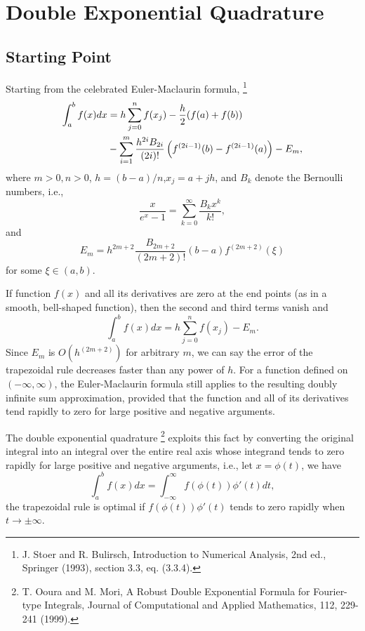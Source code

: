 \chapter{Double Exponential Quadrature}

\section{Starting Point}

Starting from the celebrated Euler-Maclaurin formula, 
\footnote{J. Stoer and R. Bulirsch, Introduction to Numerical Analysis, 2nd ed.,
Springer (1993), section 3.3, eq. (3.3.4).}
\begin{align}
  \int_a^b f(x) dx 
    &= h\sum_{j=0}^n f(x_j) - \frac{h}{2}(f(a)+f(b)) \notag \\
    &- \sum_{i=1}^m \frac{h^{2i} B_{2i}}{ (2i)! } 
       \left( f^{(2i-1)}(b) - f^{(2i-1)}(a)  \right)
       - E_m, \notag \\
\end{align}
where $m>0,n>0$, $h=(b-a)/n$,$x_j=a+jh$,
and $B_k$ denote the Bernoulli numbers, i.e., 
\begin{equation}
  \frac{x}{e^x-1} = \sum_{k=0}^{\infty} \frac{B_k x^k}{k!},
\end{equation}
and 
\begin{equation}
  E_m = h^{2m+2} \frac{B_{2m+2}}{(2m+2)!} (b-a) f^{(2m+2)}(\xi)
\end{equation}
for some $\xi \in (a,b)$.

If function $f(x)$ and all its derivatives are zero at the end points (as in a
smooth, bell-shaped function), then the second and third terms vanish and 
\begin{equation}
  \int_a^b f(x) dx = h\sum_{j=0}^n f(x_j) - E_m.
\end{equation}
Since $E_m$ is $O(h^{(2m+2)})$ for arbitrary $m$, we can say the error of the
trapezoidal rule decreases faster than any power of $h$. For a function defined
on $(-\infty,\infty)$, the Euler-Maclaurin formula still applies to the
resulting doubly infinite sum approximation, provided that the function and all
of its derivatives tend rapidly to zero for large positive and negative
arguments.

The double exponential quadrature 
\footnote{T. Ooura and M. Mori, A Robust Double Exponential Formula for
Fourier-type Integrals, Journal of Computational and Applied Mathematics, 112,
229-241 (1999).}
exploits this fact by converting the original
integral into an integral over the entire real axis whose integrand tends to
zero rapidly for large positive and negative arguments, i.e., let $x=\phi(t)$,
we have
\[
  \int_a^b f(x) dx = \int_{-\infty}^{\infty} f(\phi(t)) \phi'(t) dt,
\]
the trapezoidal rule is optimal if $f(\phi(t)) \phi'(t)$ tends to zero rapidly
when $t\to \pm \infty$.

